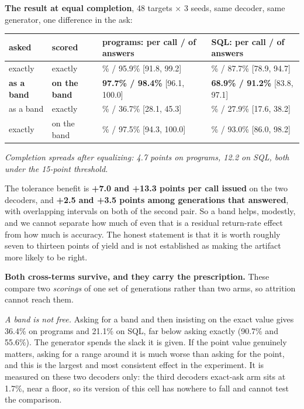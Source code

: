 \documentclass[
  10pt,
]{article}
\theoremstyle{plain}
\theoremstyle{definition}
\begin{document}
\textbf{The result at equal completion}, 48 targets × 3 seeds, same
decoder, same generator, one difference in the ask:

{\footnotesize
\begin{longtable}[]{@{}>{\raggedright\arraybackslash}p{}>{\raggedright\arraybackslash}p{}>{\raggedright\arraybackslash}p{}>{\raggedright\arraybackslash}p{}@{}}
\toprule\noalign{}
asked & scored & programs: per call / of answers & SQL: per call / of
answers \\
\midrule\noalign{}
\endhead
\bottomrule\noalign{}
\endlastfoot
exactly & exactly & 90.7\% / 95.9\% {[}91.8, 99.2{]} & 55.6\% / 87.7\%
{[}78.9, 94.7{]} \\
\textbf{as a band} & \textbf{on the band} & \textbf{97.7\% / 98.4\%}
{[}96.1, 100.0{]} & \textbf{68.9\% / 91.2\%} {[}83.8, 97.1{]} \\
as a band & exactly & 36.4\% / 36.7\% {[}28.1, 45.3{]} & 21.1\% / 27.9\%
{[}17.6, 38.2{]} \\
exactly & on the band & 92.2\% / 97.5\% {[}94.3, 100.0{]} & 58.9\% /
93.0\% {[}86.0, 98.2{]} \\
\end{longtable}}

\emph{Completion spreads after equalizing: 4.7 points on programs, 12.2
on SQL, both under the 15-point threshold.}

The tolerance benefit is \textbf{+7.0 and +13.3 points per call issued}
on the two decoders, and \textbf{+2.5 and +3.5 points among generations
that answered}, with overlapping intervals on both of the second pair.
So a band helps, modestly, and we cannot separate how much of even that
is a residual return-rate effect from how much is accuracy. The honest
statement is that it is worth roughly seven to thirteen points of yield
and is not established as making the artifact more likely to be right.

\textbf{Both cross-terms survive, and they carry the prescription.}
These compare two \emph{scorings} of one set of generations rather than
two arms, so attrition cannot reach them.

\emph{A band is not free.} Asking for a band and then insisting on the
exact value gives 36.4\% on programs and 21.1\% on SQL, far below asking
exactly (90.7\% and 55.6\%). The generator spends the slack it is given.
If the point value genuinely matters, asking for a range around it is
much worse than asking for the point, and this is the largest and most
consistent effect in the experiment. It is measured on these two
decoders only: the third decoder\textquotesingle s exact-ask arm sits at
1.7\%, near a floor, so its version of this cell has nowhere to fall and
cannot test the comparison.
\end{document}
